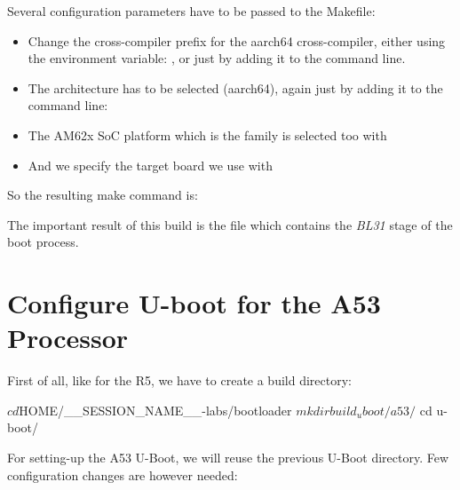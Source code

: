 Several configuration parameters have to be passed to the Makefile:
\begin{itemize}
\item Change the cross-compiler prefix for the aarch64 cross-compiler,
  either using the environment variable: , or just by adding it to the
   command line.
\item The architecture has to be selected (aarch64), again just by
  adding it to the  command line: 
\item The AM62x SoC platform which is the  family is selected
  too with 
\item And we specify the target board we use with 
\end{itemize}

So the resulting make command is:

The important result of this build is the file
 which contains the {\em BL31}
stage of the boot process.

\section{Configure U-boot for the A53 Processor}

First of all, like for the R5, we have to create a build directory:
\begin{bashinput}
$ cd $HOME/__SESSION_NAME__-labs/bootloader
$ mkdir build_uboot/a53/
$ cd u-boot/
\end{bashinput}

For setting-up the A53 U-Boot, we will reuse the previous
U-Boot directory. Few configuration changes are however needed:

